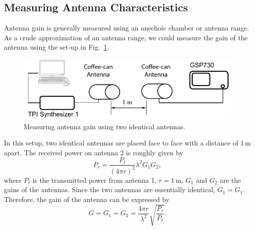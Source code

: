 \documentclass[letterpaper, 11pt]{article}
\begin{document}
\subsection{Measuring Antenna Characteristics}

Antenna gain is generally measured using an anechoic chamber or antenna range. As a crude approximation of an antenna range, we could measure the gain of the antenna using the set-up in Fig.~\ref{fig:gain_measure}.
	\begin{figure}[ht]
		\centering	
		\includegraphics[width=4.5in]{gain_measure}
		\caption{Measuring antenna gain using two identical antennas.}
		\label{fig:gain_measure}
	\end{figure}
	
In this setup, two identical antennas are placed face to face with a distance of 1\,m apart. The received power on antenna 2 is roughly given by 
\[
	P_r = \frac{P_t}{\left( 4\pi r \right)^2} \lambda^2 G_1 G_2,
\]
where $P_t$ is the transmitted power from antenna 1, $r = 1$\,m, $G_1$ and $G_2$ are the gains of the antennas. Since the two antennas are essentially identical, $G_1 = G_1$. Therefore, the gain of the antenna can be expressed by 
\begin{equation}
	G = G_1 = G_2 =\frac{4\pi r}{\lambda^2}\sqrt{\frac{P_r}{P_t}}.
	\label{eqn:gain}
\end{equation}
\end{document}
